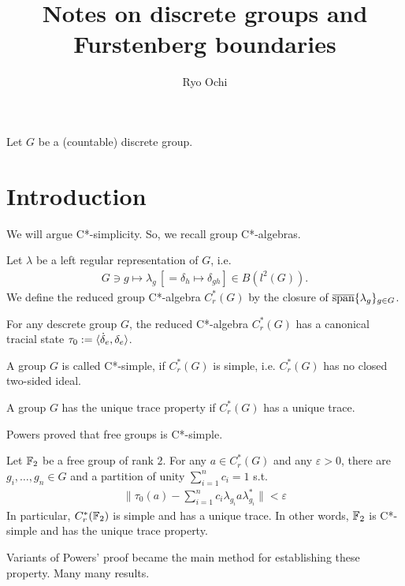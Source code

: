 \documentclass{article}[12pt]
\author{Ryo Ochi}
\title{Notes on discrete groups and Furstenberg boundaries}
\begin{document}
\maketitle
\tableofcontents
Let $G$ be  a (countable) discrete group.
\section{Introduction}
We will argue C*-simplicity.
So, we recall group C*-algebras.
\begin{definition}
  Let $\lambda$ be a left regular representation of $G$,
  i.e.
  \begin{align*}
    G \ni g \mapsto \lambda_g \, [ = \delta_h \mapsto \delta_{gh} ] \in B(l^2(G)).
  \end{align*}
  We define the reduced group C*-algebra $C_r^*(G)$ by the closure of $ \overline{\rm span}\{\lambda_g\}_{g \in G}$.

  For any descrete group $G$, the reduced C*-algebra $C_r^*(G)$ has a canonical tracial state $\tau_0 := \langle \dot \delta_e, \delta_e \rangle$.
\end{definition}

\begin{definition}
  A group $G$ is called C*-simple, if $C_r^*(G)$ is simple,
  i.e.
  $C_r^*(G)$ has no closed two-sided ideal.

  A group $G$ has the unique trace property if $C_r^*(G)$ has a unique trace.
\end{definition}

Powers \cite{powers1975simplicity} proved that free groups is C*-simple.
\begin{theorem}
  Let $\mathbb{F}_2$ be a free group of rank $2$.
  For any $a \in C_r^*(G)$ and any $ \varepsilon > 0$,
  there are $g_i, \ldots, g_n \in G$ and a partition of unity $\sum_{i=1}^n c_i = 1$ s.t.
  \begin{align*}
    \| \tau_0(a) - \sum_{i=1}^n c_i \lambda_{g_i} a \lambda_{g_i}^* \| < \varepsilon
  \end{align*}
  In particular, $C_r^*(\mathbb{F}_2)$ is simple and has a unique trace.
  In other words, $\mathbb{F}_2$ is C*-simple and has the unique trace property.
\end{theorem}

Variants of Powers' proof became the main method for establishing these property.
Many many results.
\end{document}
